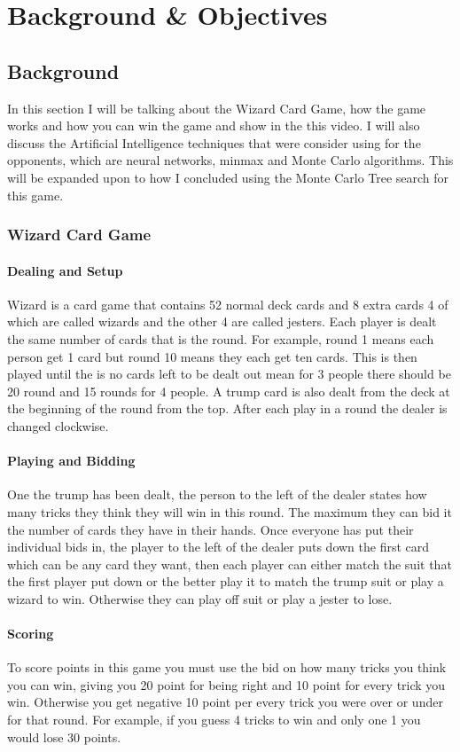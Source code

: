 \chapter{Background \& Objectives}


\section{Background}
In this section I will be talking about the Wizard Card Game, how the game works and how you can win the game and show in the this video\cite{wizardVideo}. I will also discuss the Artificial Intelligence techniques that were consider using for the opponents, which are neural networks, minmax and Monte Carlo algorithms. This will be expanded upon to how I concluded using the Monte Carlo Tree search for this game.
\subsection{Wizard Card Game}
\subsubsection{Dealing and Setup}
Wizard is a card game that contains 52 normal deck cards and 8 extra cards 4 of which are called wizards and the other 4 are called jesters\cite{wizardOver}.  Each player is dealt the same number of cards that is the round. For example, round 1 means each person get 1 card but round 10 means they each get ten cards. This is then played until the is no cards left to be dealt out mean for 3 people there should be 20 round and 15 rounds for 4 people.  A trump card is also dealt from the deck at the beginning of the round from the top.  After each play in a round the dealer is changed clockwise.
\subsubsection{Playing and Bidding}
One the trump has been dealt, the person to the left of the dealer states how many tricks they think they will win in this round. The maximum they can bid it the number of cards they have in their hands.  Once everyone has put their individual bids in, the player to the left of the dealer puts down the first card which can be any card they want, then each player can either match the suit that the first player put down or the better play it to match the trump suit or play a wizard to win. Otherwise they can play off suit or play a jester to lose.
\subsubsection{Scoring}
To score points in this game you must use the bid on how many tricks you think you can win, giving you 20 point for being right and 10 point for every trick you win. Otherwise you get negative 10 point per every trick you were over or under for that round. For example, if you guess 4 tricks to win and only one 1 you would lose 30 points. 



